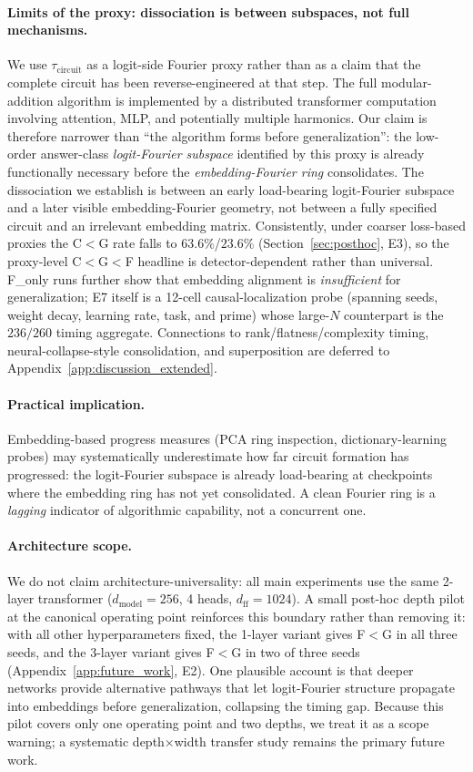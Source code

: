 \documentclass{article}
\newcommand{\taucirc}{\tau_{\mathrm{circuit}}}
\begin{document}
\paragraph{Limits of the proxy: dissociation is between subspaces, not full mechanisms.}
We use $\taucirc$ as a logit-side Fourier proxy rather than as a
claim that the complete circuit has been reverse-engineered at that
step. The full modular-addition algorithm is implemented by a
distributed transformer computation involving attention, MLP, and
potentially multiple harmonics. Our claim is therefore narrower
than ``the algorithm forms before generalization'': the low-order
answer-class \emph{logit-Fourier subspace} identified by this proxy
is already functionally necessary before the
\emph{embedding-Fourier ring} consolidates. The dissociation we
establish is between an early load-bearing logit-Fourier subspace
and a later visible embedding-Fourier geometry, not between a fully
specified circuit and an irrelevant embedding matrix.
Consistently, under coarser loss-based proxies the C$<$G rate falls
to $63.6\%$/$23.6\%$ (Section~\ref{sec:posthoc}, E3), so the
proxy-level C$<$G$<$F headline is detector-dependent rather than
universal. F\_only runs further show that embedding alignment is
\emph{insufficient} for generalization; E7 itself is a 12-cell
causal-localization probe (spanning seeds, weight decay, learning
rate, task, and prime) whose large-$N$ counterpart is the
$236/260$ timing aggregate. Connections to rank/flatness/complexity
timing, neural-collapse-style consolidation, and superposition are
deferred to Appendix~\ref{app:discussion_extended}.

\paragraph{Practical implication.}
Embedding-based progress measures (PCA ring inspection,
dictionary-learning probes) may systematically underestimate how far
circuit formation has progressed: the logit-Fourier subspace is
already load-bearing at checkpoints where the embedding ring has not
yet consolidated. A clean Fourier ring is a \emph{lagging} indicator
of algorithmic capability, not a concurrent one.

\paragraph{Architecture scope.}
We do not claim architecture-universality: all main experiments use
the same 2-layer transformer ($d_{\mathrm{model}}{=}256$, 4 heads,
$d_{\mathrm{ff}}{=}1024$). A small post-hoc depth pilot at the
canonical operating point reinforces this boundary rather than
removing it: with all other hyperparameters fixed, the 1-layer
variant gives F$<$G in all three seeds, and the 3-layer variant gives
F$<$G in two of three seeds
(Appendix~\ref{app:future_work}, E2). One plausible account is that
deeper networks provide alternative pathways that let logit-Fourier
structure propagate into embeddings before generalization, collapsing
the timing gap. Because this pilot covers only one operating point
and two depths, we treat it as a scope warning; a systematic
depth$\times$width transfer study remains the primary future work.
\end{document}
